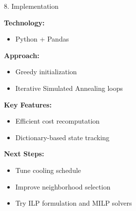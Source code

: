 \documentclass[aspectratio=169]{beamer}
\begin{document}
\begin{frame}{8. Implementation}

\textbf{Technology:}
\begin{itemize}
    \item Python + Pandas
\end{itemize}

\textbf{Approach:}
\begin{itemize}
    \item Greedy initialization
    \item Iterative Simulated Annealing loops
\end{itemize}

\vspace{0.3cm}

\textbf{Key Features:}
\begin{itemize}
    \item Efficient cost recomputation
    \item Dictionary-based state tracking
\end{itemize}

\vspace{0.3cm}

\textbf{Next Steps:}
\begin{itemize}
    \item Tune cooling schedule
    \item Improve neighborhood selection
    \item Try ILP formulation and MILP solvers
\end{itemize}

\end{frame}
\end{document}
